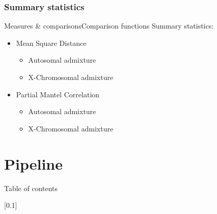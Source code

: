 \documentclass[10pt, aspectratio=43]{beamer}
\begin{document}
\subsubsection{Summary statistics}
\begin{frame}{Measures \& comparisons}{Comparison functions}
Summary statistics:
\begin{itemize}
  \item Mean Square Distance
  \begin{itemize}
    \item Autosomal admixture
    \item X-Chromosomal admixture
  \end{itemize}
  \item Partial Mantel Correlation
  \begin{itemize}
    \item Autosomal admixture
    \item X-Chromosomal admixture
  \end{itemize}
\end{itemize}
\end{frame}


\section{Pipeline}
\begin{frame}{}{Table of contents}
\tableofcontents[currentsection, subsectionstyle=show/show/hide]
\end{frame}

[0.1]{}{}{}
\end{document}
